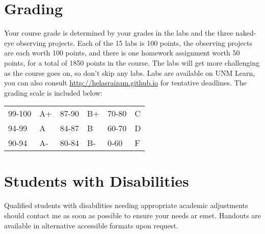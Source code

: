 \documentclass[12pt]{article}
\begin{document}
\section*{Grading}
Your course grade is determined by your grades in the labs and the three naked-eye observing projects.  Each of the 15 labs is 100 points, the observing projects are each worth 100 points, and there is one homework assignment worth 50 points, for a total of 1850 points in the course.  The labs will get more challenging as the course goes on, so don't skip any labs.  Labs are available on UNM Learn, you can also consult \url{http://helasraizam.github.io} for tentative deadlines.  The grading scale is included below:

\begin{center}\begin{tabular}{l l@{\hskip .5in}l l@{\hskip .5in}l l}
  99-100&A+ &87-90&B+ &70-80&C\\
  94-99&A &84-87&B &60-70&D\\
  90-94&A- &80-84&B- &0-60&F
\end{tabular}\end{center}

\section*{Students with Disabilities}
Qualified students with disabilities needing appropriate academic adjustments should contact me as soon as possible to ensure your needs ar emet.  Handouts are available in alternative accessible formats upon request.
\end{document}
